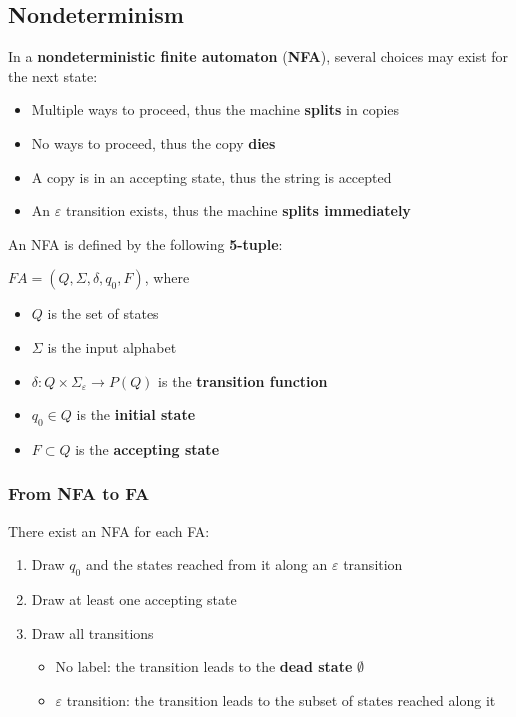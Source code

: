 \documentclass{article}
\begin{document}
\subsection{Nondeterminism}
In a \textbf{nondeterministic finite automaton} (\textbf{NFA}), several choices may exist for the next state:
\begin{itemize}
    \item Multiple ways to proceed, thus the machine \textbf{splits} in copies
    \item No ways to proceed, thus the copy \textbf{dies}
    \item A copy is in an accepting state, thus the string is accepted
    \item An $\varepsilon$ transition exists, thus the machine \textbf{splits immediately}
\end{itemize}
An NFA is defined by the following \textbf{5-tuple}:
\begin{center}
    $FA = (Q, \Sigma, \delta, q_0, F)$, where
\end{center}
\begin{itemize}
    \item $Q$ is the set of states
    \item $\Sigma$ is the input alphabet
    \item $\delta:Q\times\Sigma_\varepsilon\rightarrow P(Q)$ is the \textbf{transition function}
    \item $q_0 \in Q$ is the \textbf{initial state}
    \item $F \subset Q$ is the \textbf{accepting state}
\end{itemize}
\subsubsection{From NFA to FA}
There exist an NFA for each FA: 
\begin{enumerate}
    \item Draw $q_0$ and the states reached from it along an $\varepsilon$ transition
    \item Draw at least one accepting state
    \item Draw all transitions
        \begin{itemize}
            \item No label: the transition leads to the \textbf{dead state} $\emptyset$  
            \item $\varepsilon$ transition: the transition leads to the subset of states reached along it
        \end{itemize}
\end{enumerate}
\end{document}
